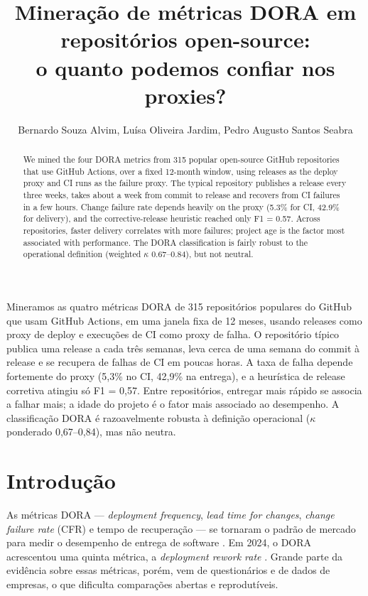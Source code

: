 \documentclass[12pt]{article}
\title{Mineração de métricas DORA em repositórios open-source:\\
o quanto podemos confiar nos proxies?}
\author{Bernardo Souza Alvim\inst{1}, Luísa Oliveira Jardim\inst{1},
  Pedro Augusto Santos Seabra\inst{1}}
\begin{document}
\maketitle

\begin{abstract}
  We mined the four DORA metrics from 315 popular open-source GitHub
  repositories that use GitHub Actions, over a fixed 12-month window, using
  releases as the deploy proxy and CI runs as the failure proxy. The typical
  repository publishes a release every three weeks, takes about a week from
  commit to release and recovers from CI failures in a few hours. Change
  failure rate depends heavily on the proxy (5.3\% for CI, 42.9\% for
  delivery), and the corrective-release heuristic reached only F1 = 0.57.
  Across repositories, faster delivery
  correlates with more failures; project age is the factor most associated
  with performance. The DORA classification is fairly robust to the
  operational definition (weighted $\kappa$ 0.67--0.84), but not neutral.
\end{abstract}

\begin{resumo}
  Mineramos as quatro métricas DORA de 315 repositórios populares do GitHub
  que usam GitHub Actions, em uma janela fixa de 12 meses, usando releases
  como proxy de deploy e execuções de CI como proxy de falha. O repositório
  típico publica uma release a cada três semanas, leva cerca de uma semana do
  commit à release e se recupera de falhas de CI em poucas horas. A taxa de
  falha depende fortemente do proxy (5,3\% no CI, 42,9\% na entrega), e a
  heurística de release corretiva atingiu só F1 = 0,57. Entre repositórios, entregar mais rápido se
  associa a falhar mais; a idade do projeto é o fator mais associado ao
  desempenho. A classificação DORA é razoavelmente robusta à definição
  operacional ($\kappa$ ponderado 0,67--0,84), mas não neutra.
\end{resumo}

\section{Introdução}

As métricas DORA --- \emph{deployment frequency}, \emph{lead time for
changes}, \emph{change failure rate} (CFR) e tempo de recuperação --- se
tornaram o padrão de mercado para medir o desempenho de entrega de software
\cite{forsgren2018,dora2025keys}. Em 2024, o DORA acrescentou uma quinta
métrica, a \emph{deployment rework rate} \cite{dora2024history}. Grande parte
da evidência sobre essas métricas, porém, vem de questionários e de dados de
empresas, o que dificulta comparações abertas e reprodutíveis.
\end{document}
